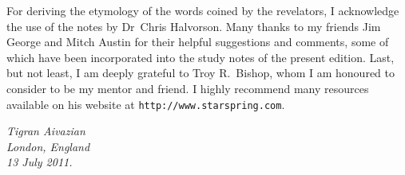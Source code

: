 For deriving the etymology of the words coined by the revelators, I acknowledge the use of the notes by Dr~Chris Halvorson.
Many thanks to my friends Jim George and Mitch Austin for their helpful suggestions and comments,
some of which have been incorporated into the study notes of the present edition.
Last, but not least, I am deeply grateful to Troy R.~Bishop, whom I am honoured to consider to be my mentor and friend.
I highly recommend many resources available on his website at \texttt{http://www.starspring.com}.


\begin{flushleft}
\itshape
\hspace*{6pt}Tigran Aivazian\\
\hspace*{6pt}London, England\\
\hspace*{6pt}13 July 2011.\\
\end{flushleft}
